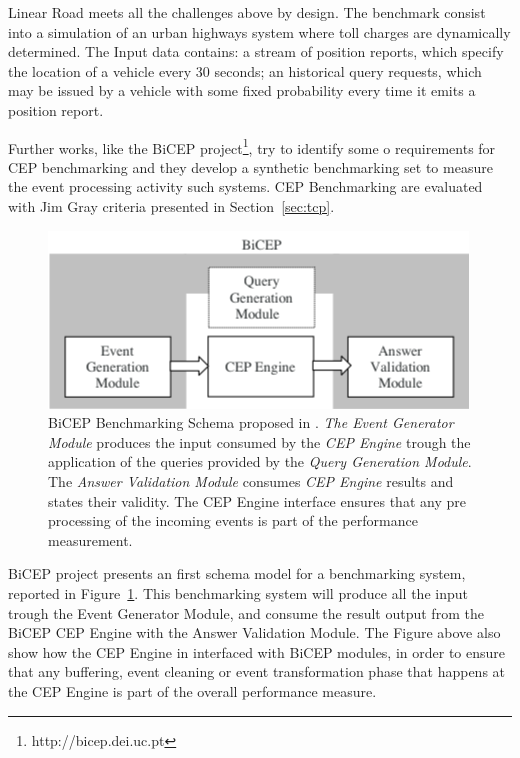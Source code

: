 Linear Road meets all the challenges above by design. The benchmark consist into a simulation of an urban highways system where toll charges are dynamically determined. The Input data contains: a stream of position reports, which specify the location of a vehicle every 30 seconds; an historical query requests, which may be issued by a vehicle with some fixed probability every time it emits a position report.

Further works, like the BiCEP project\footnote{http://bicep.dei.uc.pt}, try to identify some o requirements for CEP benchmarking and they develop a synthetic benchmarking set to measure the event processing activity such systems. CEP Benchmarking are evaluated with Jim Gray criteria presented in Section~\ref{sec:tcp}. 

\begin{figure}[tbh]
  \centering
	\includegraphics[width=\linewidth]{images/bicep_schema}
	\caption[BiCEP Benchmarking Schema]{BiCEP Benchmarking Schema proposed in \cite{bizarro:DSP:2007:1143}. \textit{The Event Generator Module} produces the input consumed by the \textit{CEP Engine} trough the application of the queries provided by the \textit{Query Generation Module}. The \textit{Answer Validation Module} consumes \textit{CEP Engine} results and states their validity. The CEP Engine interface ensures that any pre processing of the incoming events is part of the performance measurement.} 
  	\label{fig:bicep-schema}
\end{figure}

BiCEP project presents an first schema model for a benchmarking system, reported in Figure~\ref{fig:bicep-schema}. This benchmarking system will produce all the input trough the Event Generator Module, and consume the result output from the BiCEP CEP Engine with the Answer Validation Module. The Figure above also show how the CEP Engine in interfaced with BiCEP modules, in order to ensure that any buffering, event cleaning or event transformation phase that happens at the CEP Engine is part of the overall performance measure. 

